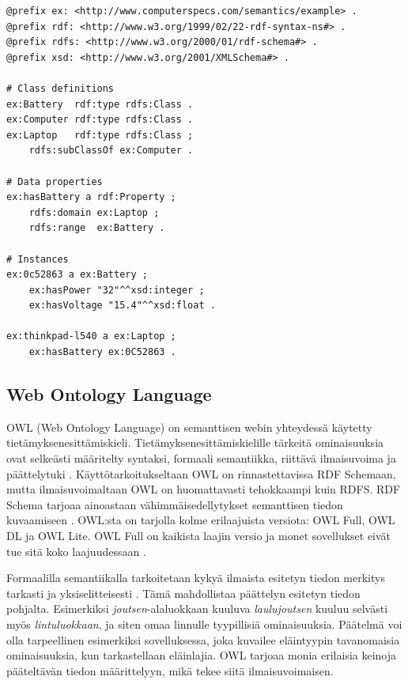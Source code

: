 \documentclass[finnish, 12pt, a4paper, elec, utf8, pdfa, online]{aaltothesis}
\begin{document}
{%
\vskip 0.3cm
\begin{lstlisting}[style=codeblock,caption={RDFS esimerkki.},captionpos=b,label={rdfs_esim}]
@prefix ex: <http://www.computerspecs.com/semantics/example> .
@prefix rdf: <http://www.w3.org/1999/02/22-rdf-syntax-ns#> .
@prefix rdfs: <http://www.w3.org/2000/01/rdf-schema#> .
@prefix xsd: <http://www.w3.org/2001/XMLSchema#> .

# Class definitions
ex:Battery  rdf:type rdfs:Class .
ex:Computer rdf:type rdfs:Class .
ex:Laptop   rdf:type rdfs:Class ;
    rdfs:subClassOf ex:Computer .

# Data properties
ex:hasBattery a rdf:Property ;
    rdfs:domain ex:Laptop ;
    rdfs:range  ex:Battery .

# Instances
ex:0c52863 a ex:Battery ;
    ex:hasPower "32"^^xsd:integer ;
    ex:hasVoltage "15.4"^^xsd:float .

ex:thinkpad-l540 a ex:Laptop ;
    ex:hasBattery ex:0C52863 .
\end{lstlisting}


\subsection{Web Ontology Language}
OWL (Web Ontology Language) on semanttisen webin yhteydessä käytetty tietämyksenesittämiskieli. Tietämyksenesittämiskielille tärkeitä ominaisuuksia ovat selkeästi määritelty syntaksi, formaali semantiikka, riittävä ilmaisuvoima ja päättelytuki \cite{Antoniou}. Käyttötarkoitukseltaan OWL on rinnastettavissa RDF Schemaan, mutta ilmaisuvoimaltaan OWL on huomattavasti tehokkaampi kuin RDFS. RDF Schema tarjoaa ainoastaan vähimmäisedellytykset semanttisen tiedon kuvaamiseen \cite{revisited}. OWL:sta on tarjolla kolme erilaajuista versiota: OWL Full, OWL DL ja OWL Lite. OWL Full on kaikista laajin versio ja monet sovellukset eivät tue sitä koko laajuudessaan \cite{OWL_specification}.

Formaalilla semantiikalla tarkoitetaan kykyä ilmaista esitetyn tiedon merkitys tarkasti ja yksiselitteisesti \cite{Antoniou}. Tämä mahdollistaa päättelyn esitetyn tiedon pohjalta. Esimerkiksi \textit{joutsen}-alaluokkaan kuuluva \textit{laulujoutsen} kuuluu selvästi myös \textit{lintuluokkaan}, ja siten omaa linnulle tyypillisiä ominaisuuksia. Päätelmä voi olla tarpeellinen esimerkiksi sovelluksessa, joka kuvailee eläintyypin tavanomaisia ominaisuuksia, kun tarkastellaan eläinlajia. OWL tarjoaa monia erilaisia keinoja pääteltävän tiedon määrittelyyn, mikä tekee siitä ilmaisuvoimaisen.

}
\end{document}
